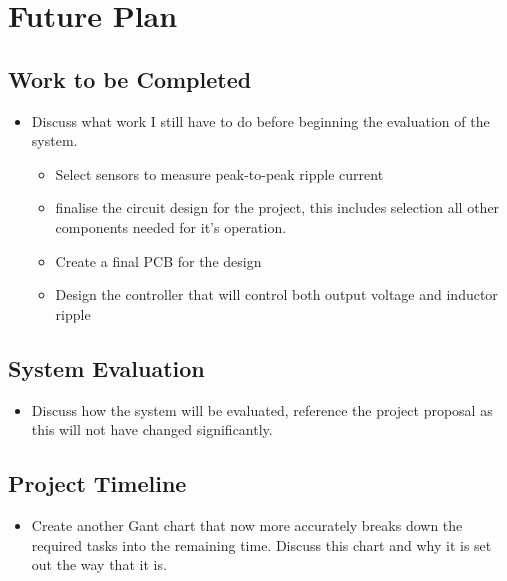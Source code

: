 \chapter{Future Plan}\label{C:future} 

\section{Work to be Completed}

\begin{itemize}

    \item 
    Discuss what work I still have to do before beginning the evaluation of the system. 

    \begin{itemize}
        \item Select sensors to measure peak-to-peak ripple current
        \item finalise the circuit design for the project, this includes selection all other components needed for it's operation.
        \item Create a final PCB for the design 
        \item Design the controller that will control both output voltage and inductor ripple 
    \end{itemize}

\end{itemize}

\section{System Evaluation}

\begin{itemize}

    \item 
    Discuss how the system will be evaluated, reference the project proposal as this will not have changed significantly.  

\end{itemize}

\section{Project Timeline}

\begin{itemize}

    \item 
    Create another Gant chart that now more accurately breaks down the required tasks into the remaining time. Discuss this chart and why it is set out the way that it is. 

\end{itemize}